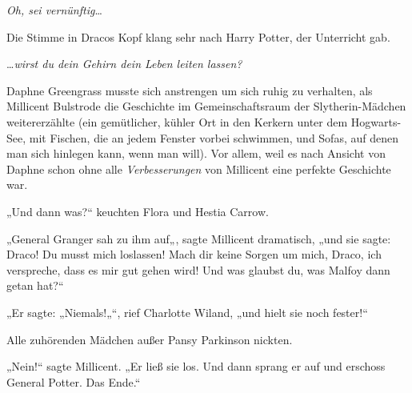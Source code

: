 \emph{Oh, sei vernünftig}…

Die Stimme in Dracos Kopf klang sehr nach Harry Potter, der Unterricht gab.

…\emph{wirst du dein Gehirn dein Leben leiten lassen?}


Daphne Greengrass musste sich anstrengen um sich ruhig zu verhalten, als Millicent Bulstrode die Geschichte im Gemeinschaftsraum der Slytherin-Mädchen weitererzählte (ein gemütlicher, kühler Ort in den Kerkern unter dem Hogwarts-See, mit Fischen, die an jedem Fenster vorbei schwimmen, und Sofas, auf denen man sich hinlegen kann, wenn man will). Vor allem, weil es nach Ansicht von Daphne schon ohne alle \emph{Verbesserungen} von Millicent eine perfekte Geschichte war.

„Und dann was?“ keuchten Flora und Hestia Carrow.

„General Granger sah zu ihm auf„, sagte Millicent dramatisch, „und sie sagte: Draco! Du musst mich loslassen! Mach dir keine Sorgen um mich, Draco, ich verspreche, dass es mir gut gehen wird! Und was glaubst du, was Malfoy dann getan hat?“

„Er sagte: „Niemals!„“, rief Charlotte Wiland, „und hielt sie noch fester!“

Alle zuhörenden Mädchen außer Pansy Parkinson nickten.

„Nein!“ sagte Millicent. „Er ließ sie los. Und dann sprang er auf und erschoss General Potter. Das Ende.“

